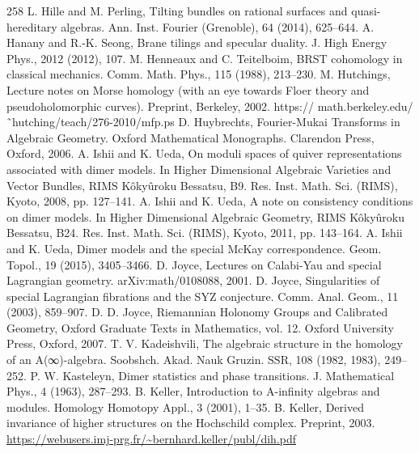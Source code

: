 \begin{thebibliography}{258}
\hypertarget{ref:120}{} L. Hille and M. Perling, Tilting bundles on rational surfaces and quasi-hereditary algebras. Ann. Inst. Fourier (Grenoble), 64 (2014), 625–644.
\hypertarget{ref:121}{} A. Hanany and R.-K. Seong, Brane tilings and specular duality. J. High Energy Phys., 2012 (2012), 107.
\hypertarget{ref:122}{} M. Henneaux and C. Teitelboim, BRST cohomology in classical mechanics. Comm. Math. Phys., 115 (1988), 213–230.
\hypertarget{ref:123}{} M. Hutchings, Lecture notes on Morse homology (with an eye towards Floer theory and pseudoholomorphic curves). Preprint, Berkeley, 2002. https:// math.berkeley.edu/˜hutching/teach/276-2010/mfp.ps
\hypertarget{ref:124}{} D. Huybrechts, Fourier-Mukai Transforms in Algebraic Geometry. Oxford Mathematical Monographs. Clarendon Press, Oxford, 2006.
\hypertarget{ref:125}{} A. Ishii and K. Ueda, On moduli spaces of quiver representations associated with dimer models. In Higher Dimensional Algebraic Varieties and Vector Bundles, RIMS Kôkyûroku Bessatsu, B9. Res. Inst. Math. Sci. (RIMS), Kyoto, 2008, pp. 127–141.
\hypertarget{ref:126}{} A. Ishii and K. Ueda, A note on consistency conditions on dimer models. In Higher Dimensional Algebraic Geometry, RIMS Kôkyûroku Bessatsu, B24. Res. Inst. Math. Sci. (RIMS), Kyoto, 2011, pp. 143–164.
\hypertarget{ref:127}{} A. Ishii and K. Ueda, Dimer models and the special McKay correspondence. Geom. Topol., 19 (2015), 3405–3466.
\hypertarget{ref:128}{} D. Joyce, Lectures on Calabi-Yau and special Lagrangian geometry. arXiv:math/0108088, 2001.
\hypertarget{ref:129}{} D. Joyce, Singularities of special Lagrangian fibrations and the SYZ conjecture. Comm. Anal. Geom., 11 (2003), 859–907.
\hypertarget{ref:130}{} D. D. Joyce, Riemannian Holonomy Groups and Calibrated Geometry, Oxford Graduate Texts in Mathematics, vol. 12. Oxford University Press, Oxford, 2007.
\hypertarget{ref:131}{} T. V. Kadeishvili, The algebraic structure in the homology of an A(∞)-algebra. Soobshch. Akad. Nauk Gruzin. SSR, 108 (1982, 1983), 249–252.
\hypertarget{ref:132}{} P. W. Kasteleyn, Dimer statistics and phase transitions. J. Mathematical Phys., 4 (1963), 287–293.
\hypertarget{ref:133}{} B. Keller, Introduction to A-infinity algebras and modules. Homology Homotopy Appl., 3 (2001), 1–35.
\hypertarget{ref:134}{} B. Keller, Derived invariance of higher structures on the Hochschild complex. Preprint, 2003. \url{https://webusers.imj-prg.fr/~bernhard.keller/publ/dih.pdf}

\end{thebibliography}
